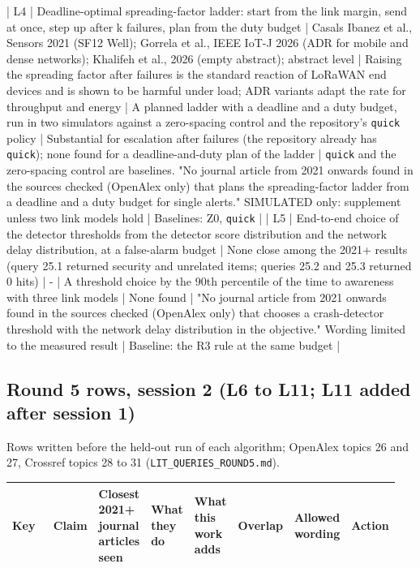 | L4 | Deadline-optimal spreading-factor ladder: start from the link margin, send at once, step up after k failures, plan from the duty budget | Casals Ibanez et al., Sensors 2021 (SF12 Well); Gorrela et al., IEEE IoT-J 2026 (ADR for mobile and dense networks); Khalifeh et al., 2026 (empty abstract); abstract level | Raising the spreading factor after failures is the standard reaction of LoRaWAN end devices and is shown to be harmful under load; ADR variants adapt the rate for throughput and energy | A planned ladder with a deadline and a duty budget, run in two simulators against a zero-spacing control and the repository's \texttt{quick} policy | Substantial for escalation after failures (the repository already has \texttt{quick}); none found for a deadline-and-duty plan of the ladder | \texttt{quick} and the zero-spacing control are baselines. "No journal article from 2021 onwards found in the sources checked (OpenAlex only) that plans the spreading-factor ladder from a deadline and a duty budget for single alerts." SIMULATED only: supplement unless two link models hold | Baselines: Z0, \texttt{quick} |
| L5 | End-to-end choice of the detector thresholds from the detector score distribution and the network delay distribution, at a false-alarm budget | None close among the 2021+ results (query 25.1 returned security and unrelated items; queries 25.2 and 25.3 returned 0 hits) | - | A threshold choice by the 90th percentile of the time to awareness with three link models | None found | "No journal article from 2021 onwards found in the sources checked (OpenAlex only) that chooses a crash-detector threshold with the network delay distribution in the objective." Wording limited to the measured result | Baseline: the R3 rule at the same budget |


\subsection*{Round 5 rows, session 2 (L6 to L11; L11 added after session 1)}

Rows written before the held-out run of each algorithm; OpenAlex topics 26 and 27, Crossref topics 28 to 31 (\texttt{LIT\_QUERIES\_ROUND5.md}).

{\scriptsize\raggedright
\begin{longtable}{p{0.119\linewidth}p{0.119\linewidth}p{0.119\linewidth}p{0.119\linewidth}p{0.119\linewidth}p{0.119\linewidth}p{0.119\linewidth}p{0.119\linewidth}}
\toprule
Key & Claim & Closest 2021+ journal articles seen & What they do & What this work adds & Overlap & Allowed wording & Action \\
\midrule
\endhead
\bottomrule
\end{longtable}}

